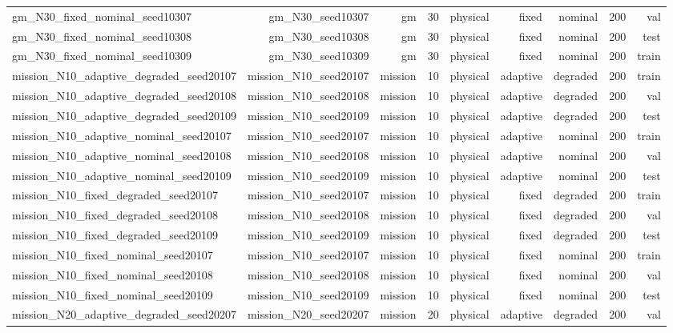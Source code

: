 \begin{tabular}{lrrrrrrrr}
gm\_N30\_fixed\_nominal\_seed10307 & gm\_N30\_seed10307 & gm & 30 & physical & fixed & nominal & 200 & val \\
gm\_N30\_fixed\_nominal\_seed10308 & gm\_N30\_seed10308 & gm & 30 & physical & fixed & nominal & 200 & test \\
gm\_N30\_fixed\_nominal\_seed10309 & gm\_N30\_seed10309 & gm & 30 & physical & fixed & nominal & 200 & train \\
mission\_N10\_adaptive\_degraded\_seed20107 & mission\_N10\_seed20107 & mission & 10 & physical & adaptive & degraded & 200 & train \\
mission\_N10\_adaptive\_degraded\_seed20108 & mission\_N10\_seed20108 & mission & 10 & physical & adaptive & degraded & 200 & val \\
mission\_N10\_adaptive\_degraded\_seed20109 & mission\_N10\_seed20109 & mission & 10 & physical & adaptive & degraded & 200 & test \\
mission\_N10\_adaptive\_nominal\_seed20107 & mission\_N10\_seed20107 & mission & 10 & physical & adaptive & nominal & 200 & train \\
mission\_N10\_adaptive\_nominal\_seed20108 & mission\_N10\_seed20108 & mission & 10 & physical & adaptive & nominal & 200 & val \\
mission\_N10\_adaptive\_nominal\_seed20109 & mission\_N10\_seed20109 & mission & 10 & physical & adaptive & nominal & 200 & test \\
mission\_N10\_fixed\_degraded\_seed20107 & mission\_N10\_seed20107 & mission & 10 & physical & fixed & degraded & 200 & train \\
mission\_N10\_fixed\_degraded\_seed20108 & mission\_N10\_seed20108 & mission & 10 & physical & fixed & degraded & 200 & val \\
mission\_N10\_fixed\_degraded\_seed20109 & mission\_N10\_seed20109 & mission & 10 & physical & fixed & degraded & 200 & test \\
mission\_N10\_fixed\_nominal\_seed20107 & mission\_N10\_seed20107 & mission & 10 & physical & fixed & nominal & 200 & train \\
mission\_N10\_fixed\_nominal\_seed20108 & mission\_N10\_seed20108 & mission & 10 & physical & fixed & nominal & 200 & val \\
mission\_N10\_fixed\_nominal\_seed20109 & mission\_N10\_seed20109 & mission & 10 & physical & fixed & nominal & 200 & test \\
mission\_N20\_adaptive\_degraded\_seed20207 & mission\_N20\_seed20207 & mission & 20 & physical & adaptive & degraded & 200 & val \\

\end{tabular}
